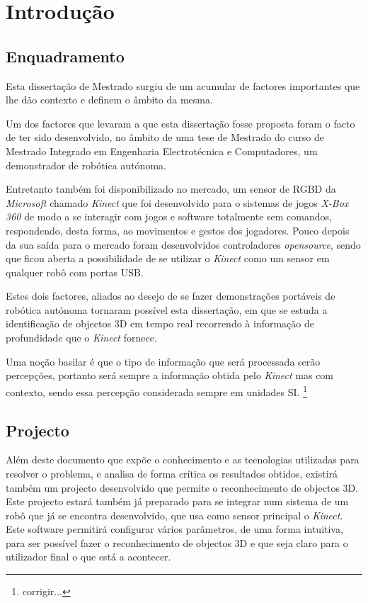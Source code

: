 \chapter{Introdução} \label{chap:intro}

\section{Enquadramento} \label{sec:context}

Esta dissertação de Mestrado surgiu de um acumular de factores importantes que lhe dão 
contexto e definem o âmbito da mesma.

Um dos factores que levaram a que esta dissertação fosse proposta foram o facto de ter sido
desenvolvido, no âmbito de uma tese de Mestrado do curso de Mestrado Integrado em
Engenharia Electrotécnica e Computadores, um demonstrador de robótica autónoma. 

Entretanto também foi disponibilizado no mercado, um sensor de RGBD da \emph{Microsoft} chamado 
\emph{Kinect} que foi desenvolvido para o sistemas de jogos \emph{X-Box 360} de modo a
se interagir com jogos e software totalmente sem comandos, respondendo, desta forma, ao movimentos e gestos
dos jogadores. Pouco depois da sua saída para o mercado foram desenvolvidos controladores \emph{opensource},
sendo que ficou aberta a possibilidade de se utilizar o \emph{Kinect} como um sensor em qualquer
robô com portas USB.

Estes dois factores, aliados ao desejo de se fazer demonstrações portáveis de robótica autónoma 
tornaram possível esta dissertação, em que se estuda a identificação de objectos 3D 
em tempo real recorrendo à informação de profundidade que o \emph{Kinect} fornece.

Uma noção basilar é que o tipo de informação que será processada serão percepções, portanto
será sempre a informação obtida pelo \emph{Kinect} mas com contexto, sendo essa percepção
considerada sempre em unidades SI. \footnote{corrigir...}

\section{Projecto} \label{sec:proj}

Além deste documento que expõe o conhecimento e as tecnologias utilizadas para resolver
o problema, e analisa de forma crítica os resultados obtidos, existirá também um projecto
desenvolvido que permite o reconhecimento de objectos 3D. Este projecto estará também já preparado
para se integrar num sistema de um robô que já se encontra desenvolvido, que usa como sensor
principal o \emph{Kinect}. Este software permitirá configurar vários parâmetros, 
de uma forma intuitiva, para ser possível fazer o reconhecimento de objectos 3D e que
seja claro para o utilizador final o que está a acontecer.

